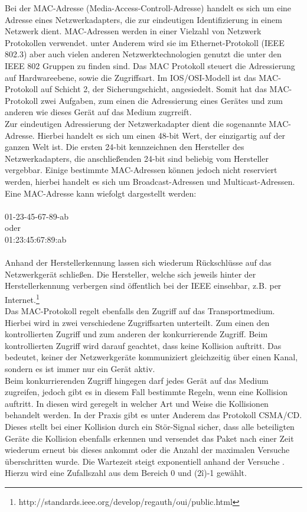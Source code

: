 Bei der MAC-Adresse (Media-Access-Controll-Adresse) handelt es sich um eine Adresse eines Netzwerkadapters, die zur eindeutigen Identifizierung in einem Netzwerk dient. MAC-Adressen werden in einer Vielzahl von Netzwerk Protokollen verwendet. unter Anderem wird sie im Ethernet-Protokoll (IEEE 802.3)  aber auch vielen anderen Netzwerktechnologien genutzt die unter den IEEE 802 Gruppen zu finden sind.
Das MAC Protokoll steuert die Adressierung auf Hardwareebene, sowie die Zugriffsart.
Im IOS/OSI-Modell ist das MAC-Protokoll auf Schicht 2, der Sicherungschicht, angesiedelt.
Somit hat das MAC-Protokoll zwei Aufgaben, zum einen die Adressierung eines Gerätes und zum anderen wie dieses Gerät auf das Medium zugrreift.\\
Zur eindeutigen Adressierung der Netzwerkadapter  dient die sogenannte MAC-Adresse. Hierbei handelt es sich um einen 48-bit Wert, der einzigartig auf der ganzen Welt ist. Die ersten 24-bit kennzeichnen den Hersteller des Netzwerkadapters, die anschließenden 24-bit sind beliebig vom Hersteller vergebbar. Einige bestimmte MAC-Adressen können jedoch nicht reserviert werden, hierbei handelt  es sich um Broadcast-Adressen und Multicast-Adressen.
Eine MAC-Adresse kann wiefolgt dargestellt werden:\\
\\
01-23-45-67-89-ab\\
oder\\
01:23:45:67:89:ab\\
\\
Anhand der Herstellerkennung lassen sich wiederum Rückschlüsse auf das Netzwerkgerät schließen. Die Hersteller, welche sich jeweils hinter der Herstellerkennung verbergen sind öffentlich bei der IEEE einsehbar, z.B. per Internet.\footnote{http://standards.ieee.org/develop/regauth/oui/public.html}\\
Das MAC-Protokoll regelt ebenfalls den Zugriff auf das Transportmedium. Hierbei wird in zwei verschiedene Zugriffsarten unterteilt. Zum einen den kontrollierten Zugriff und zum anderen der konkurrierende Zugriff.
Beim kontrollierten Zugriff wird darauf geachtet, dass keine Kollision auftritt. Das bedeutet, keiner der Netzwerkgeräte kommuniziert gleichzeitig über einen Kanal, sondern es ist immer nur ein Gerät aktiv.\\
Beim konkurrierenden Zugriff hingegen darf jedes Gerät auf das Medium zugreifen, jedoch gibt es in diesem Fall bestimmte Regeln, wenn eine Kollision auftritt. In diesen wird geregelt in welcher Art und Weise die Kollisionen behandelt werden. In der Praxis gibt es unter Anderem das Protokoll CSMA/CD. Dieses stellt bei einer Kollision durch ein Stör-Signal sicher, dass alle beteiligten Geräte die Kollision ebenfalls erkennen und versendet das Paket nach einer Zeit wiederum erneut bis dieses ankommt oder die Anzahl der maximalen Versuche überschritten wurde. Die Wartezeit steigt exponentiell anhand der Versuche . Hierzu wird eine Zufallszahl aus dem Bereich 0 und (2\^i)-1 gewählt.

